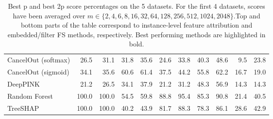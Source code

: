 \begin{table}[h!]
{{\begin{tabular}{lrrrrrrrrrr}
CancelOut (softmax) & 26.5 & 31.1 & 31.8 & 35.6 & 24.6 & 33.8 & 40.3 & 48.6 & 9.5 & 23.8 \\
CancelOut (sigmoid) & 34.1 & 35.6 & 60.6 & 61.4 & 37.5 & 44.2 & 55.8 & 62.2 & 16.7 & 19.0 \\
DeepPINK & 21.2 & 26.5 & 34.1 & 37.9 & 21.2 & 31.2 & 48.3 & 56.9 & 14.3 & 14.3 \\
Random Forest & 100.0 & 100.0 & 54.5 & 59.8 & 88.8 & 95.4 & 85.3 & 90.8 & 21.4 & 40.5 \\
TreeSHAP & 100.0 & 100.0 & 40.2 & 43.9 & 81.7 & 88.3 & 78.3 & 86.1 & 28.6 & 42.9 \\
\bottomrule
\end{tabular}}}{}
\caption{Best p and best 2p score percentages on the 5 datasets. For the first 4 datasets, scores have been averaged over $m \in \{2, 4, 6, 8, 16, 32, 64, 128, 256, 512, 1024, 2048\}$.Top and bottom parts of the table correspond to instance-level feature attribution and embedded/filter FS methods, respectively. Best performing methods are highlighted in bold.}
\end{table}
